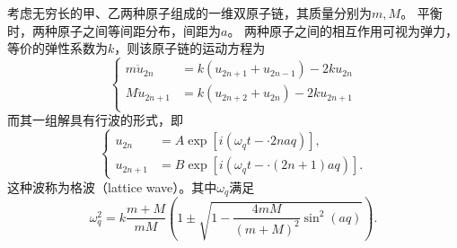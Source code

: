 \begin{proposition}
    考虑无穷长的甲、乙两种原子组成的一维双原子链，其质量分别为$m,M$。
    平衡时，两种原子之间等间距分布，间距为$a$。
    两种原子之间的相互作用可视为弹力，等价的弹性系数为$k$，则该原子链的运动方程为
    \begin{equation}
        \left\{
            \begin{aligned}
                m \ddot u_{2n} &= k(u_{2n+1} + u_{2n-1}) - 2ku_{2n} \\
                M \ddot u_{2n+1} &= k(u_{2n+2} + u_{2n}) - 2ku_{2n+1} \\
            \end{aligned}
        \right.
    \end{equation}
    而其一组解具有行波的形式，即
    \begin{equation}
        \left\{
        \begin{aligned}
            u_{2n} &= A \exp[i(\omega_q t - \cdot 2na q)], \\
            u_{2n+1} &= B\exp[i(\omega_q t - \cdot (2n+1)a q)].
        \end{aligned}
        \right.
    \end{equation}
    这种波称为格波（lattice wave）。其中$\omega_q$满足
    \begin{equation}
        \omega_q^2 = k \frac{m+M}{mM} \left( 1 \pm \sqrt{1 - \frac{4mM}{(m+M)^2} \sin^2 ( a q)} \right).
    \end{equation}
\end{proposition}

